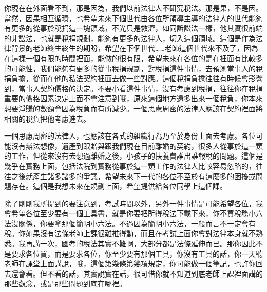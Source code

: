 \documentclass[]{ctexbook}
\begin{document}
你現在在外面看不到，那是因為，我們以前法律人不研究稅法。那是果，不是因。當然，因果相互循環，也希望未來下個世代由各位所領導主導的法律人的世代能夠有更多的從事於稅捐這一塊領域，不光只是救濟，如同訴訟法一樣，他其實很前端的非訟法，也就是稅捐規劃，能夠有更多的法律人，切入這個領域。這個是作為法律背景的老師終生終生的期盼，希望在下個世代\ldots\ldots 老師這個世代來不及了，因為在這樣一個有限的時間裡面，能做的很有限，希望未來在各位的是在裡面有比較多的可能性，我們能夠有更多的從事稅捐規劃，對稅捐這件事情，去預測當事人的稅捐負擔，從而在他的私法契約裡面去做一些對應。這個稅捐負擔往往有時候會影響到，當事人契約價格的決定。不要小看這件事情，沒有考慮到稅捐，往往你在稅捐重要的價格因素決定上面不會注意到哦，原來這個地方還多出來一個稅負，你本來想要淨賺的數額會因為稅負而有所減少。一個思慮周密的法律人應該在契約裡面將相關的稅負把他考慮進去。

一個思慮周密的法律人，也應該在各式的組織行為乃至於身份上面去考慮。各位可能沒有辦法想像，遺產到跟贈與跟我們現在目前離婚的契約，很多人從事於這一類的工作，但從來沒有去想過離婚之後，小孩子的扶養費誰出誰報稅的問題。這個是幾乎在實務上面，包括法院到實務從事於這一類工作的法律人比較容易忽略的，往往之後就產生諸多諸多的爭議，希望未來下一代的各位不至於有這麼多的困擾或問題存在。這個是我想未來在規劃上面，希望提供給各位同學上這個課。

除了剛剛我所提到的要注意到，考試時間以外，另外一件事情是可能希望各位，我會希望各位至少要有一個工具書，就是你要把所得稅法下載下來，你不買稅務小六法沒關係，你要拿那個簡明小六法。不過因為簡明小六法，一般而言不一定會有稅。你如果沒有法條老師上課很難推得動，而且在考試上面你會對法律本身就不熟悉。我再講一次，國考的稅法其實不難啊，大部分都是法條延伸而已。那你因此不是要求各位買，而是要求各位，你至少要有那個工具，你沒有工具的話，你一天聽老師在課堂上面講說，哦，這個第幾條第幾項規定，你可能做一個筆記，也許你回去還會看。但不看的話，其實說實在話，很可惜你就不知道到底老師上課裡面講的那些觀念，或是那些問題到底在哪裡。
\end{document}
